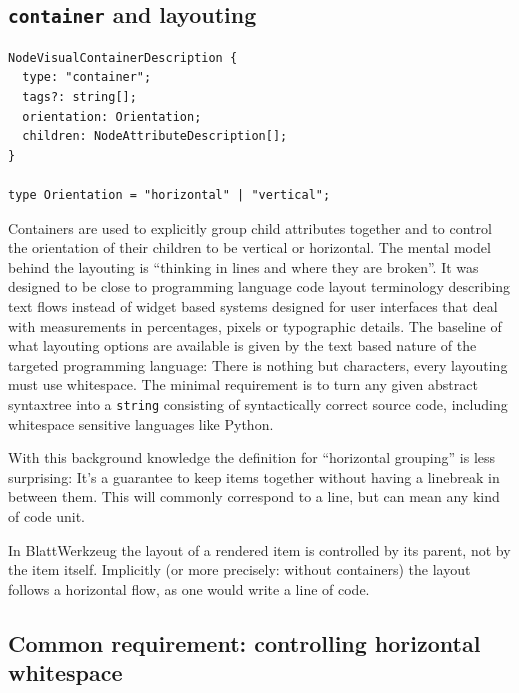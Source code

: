 \documentclass[]{report}
\begin{document}
\subsection{\texttt{container} and layouting}
\label{sec:grammar-container}

\begin{listing}[H]
\begin{verbatim}
NodeVisualContainerDescription {
  type: "container";
  tags?: string[];
  orientation: Orientation;
  children: NodeAttributeDescription[];
}

type Orientation = "horizontal" | "vertical";
\end{verbatim}
\caption{Type definition of \texttt{container} specification}
\label{lst:grammar-container-description}
\end{listing}

Containers are used to explicitly group child attributes together and to control the orientation of their children to be vertical or horizontal. The mental model behind the layouting is \enquote{thinking in lines and where they are broken}. It was designed to be close to programming language code layout terminology describing text flows instead of widget based systems designed for user interfaces that deal with measurements in percentages, pixels or typographic details. The baseline of what layouting options are available is given by the text based nature of the targeted programming language: There is nothing but characters, every layouting must use whitespace. The minimal requirement is to turn any given abstract syntaxtree into a \texttt{string} consisting of syntactically correct source code, including whitespace sensitive languages like Python.


With this background knowledge the definition for \enquote{horizontal grouping} is less surprising: It's a guarantee to keep items together without having a linebreak in between them. This will commonly correspond to a line, but can mean any kind of code unit.

In Blatt\-Werkzeug the layout of a rendered item is controlled by its parent, not by the item itself. Implicitly (or more precisely: without containers) the layout follows a horizontal flow, as one would write a line of code.

\subsection{Common requirement: controlling horizontal whitespace}
\label{sec:grammar-whitespace}
\end{document}
